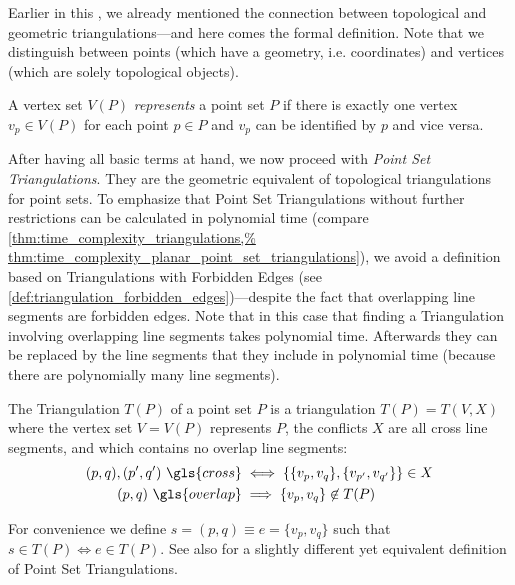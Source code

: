 Earlier in this , we already
mentioned the connection between topological and geometric
triangulations---and here comes the formal definition. Note that
we distinguish between points (which have a geometry, i.e.
coordinates) and vertices (which are solely topological objects).

\begin{definition}
  A vertex set \(V(P)\) \emph{represents} a point set \(P\) if there
  is exactly one vertex \(v_p \in V(P)\) for each point \(p \in P\)
  and \(v_p\) can be identified by \(p\) and vice versa.
\end{definition}

After having all basic terms at hand, we now proceed with
\emph{Point Set Triangulations}. They are the geometric equivalent
of topological triangulations for point sets. To emphasize that
Point Set Triangulations without further restrictions can be 
calculated in polynomial time (compare
\cref{thm:time_complexity_triangulations,%
  thm:time_complexity_planar_point_set_triangulations}),
we avoid a definition based on Triangulations with Forbidden Edges (see
\cref{def:triangulation_forbidden_edges})---despite the fact that
overlapping line segments are forbidden edges. Note that in this case that
finding a Triangulation involving overlapping line segments takes
polynomial time. Afterwards they can be replaced by the line segments
that they include in polynomial time (because there are polynomially
many line segments).

\begin{definition}
  \label{def:point_set_triangulation}
  The Triangulation \(T(P)\) of a point set \(P\)
  is a triangulation \(T(P) = T(V,X)\)
  where the vertex set \(V=V(P)\) represents \(P\), 
  the conflicts \(X\) are all \gls{cross} line segments, 
  and which contains no \gls{overlap} line segments:
  \begin{alignat*}{1}
    (p,q), (p',q')~\gls{cross}
    &\iff \left\{ \{v_p,v_q\}, \{v_{p'},v_{q'}\} \right\} \in X \\
     (p,q)~\gls{overlap}
    &\implies \{v_p,v_q\} \not\in T(P)
  \end{alignat*}

  For convenience we define \(s=(p,q) \equiv e=\{v_p,v_q\}\) such
  that \(s \in T(P) \iff e \in T(P)\). See also
  \cite[Section 9.1]{deberg_compgeom} for a slightly different yet
  equivalent definition of Point Set Triangulations.
\end{definition}

